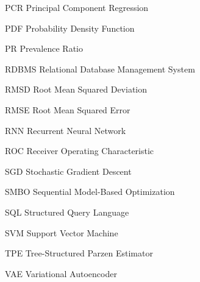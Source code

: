 \begin{symbollist}
	\item[PCR] Principal Component Regression
	\item[PDF] Probability Density Function
	\item[PR] Prevalence Ratio
	\item[RDBMS] Relational Database Management System
	\item[RMSD] Root Mean Squared Deviation
	\item[RMSE] Root Mean Squared Error
	\item[RNN] Recurrent Neural Network
	\item[ROC] Receiver Operating Characteristic
	\item[SGD] Stochastic Gradient Descent
	\item[SMBO] Sequential Model-Based Optimization
	\item[SQL] Structured Query Language
	\item[SVM] Support Vector Machine
	\item[TPE] Tree-Structured Parzen Estimator
	\item[VAE] Variational Autoencoder
\end{symbollist}
